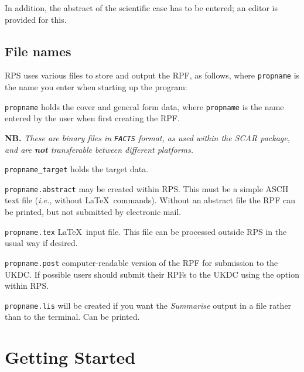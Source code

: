 In addition, the abstract of the scientific case has to be entered; an
editor is provided for this.

\subsection{File names}

RPS uses various files to store and output the RPF, as follows, where
{\tt propname} is the name you enter when starting up the program:

\begin{list}%
{}{\setlength{\leftmargin}{53mm} \setlength{\labelwidth}{40mm} \setlength{\labelsep}{6mm}
\setlength{\listparindent}{0mm} }

\item[{\tt propname} \hfill]  holds the cover and general form
data, where {\tt propname} is the name entered by the user when
first creating the RPF.

{\bf NB.} \emph{These are binary files in {\tt FACTS}
format, as used within the SCAR package, and are {\bf not} transferable
between different platforms.}

\item[{\tt propname\_target} \hfill] holds the target data.

\item[{\tt propname.abstract} \hfill] may be created within RPS.
This must be a simple ASCII text file ({\em i.e.}, without \LaTeX\
commands).  Without an abstract file the RPF can be printed, but not
submitted by electronic mail.

\item[{\tt propname.tex} \hfill] \LaTeX\ input file. This file can be
processed outside RPS in the usual way if desired.

\item[{\tt propname.post} \hfill] computer-readable version of the
RPF for submission to the UKDC.  If possible users should submit their
RPFs to the UKDC using the option within RPS.

\item[{\tt propname.lis} \hfill] will be created if you want the
{\em Summarise} output in a file rather than to the terminal.  Can be
printed.

\end{list}

\section{\label{se:getting_started}Getting Started}

